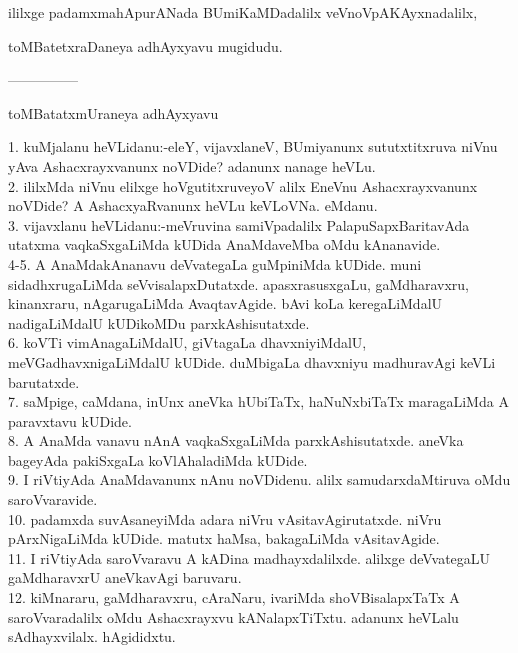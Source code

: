 \documentclass{article}
\begin{document}
\begin{center}
ililxge padamxmahApurANada BUmiKaMDadalilx veVnoVpAKAyxnadalilx,
\end{center}

\begin{center}
toMBatetxraDaneya adhAyxyavu mugidudu.
\end{center}

\begin{center}
---------------
\end{center}

\begin{center}
toMBatatxmUraneya adhAyxyavu
\end{center}

1. kuMjalanu heVLidanu:-eleY, vijavxlaneV, BUmiyanunx sututxtitxruva niVnu yAva Ashacxrayxvanunx noVDide? adanunx nanage heVLu.\\
2. ililxMda niVnu elilxge hoVgutitxruveyoV alilx EneVnu Ashacxrayxvanunx noVDide? A AshacxyaRvanunx heVLu keVLoVNa. eMdanu.\\
3. vijavxlanu heVLidanu:-meVruvina samiVpadalilx PalapuSapxBaritavAda utatxma vaqkaSxgaLiMda kUDida AnaMdaveMba oMdu kAnanavide.\\
4-5. A AnaMdakAnanavu deVvategaLa guMpiniMda kUDide. muni sidadhxrugaLiMda seVvisalapxDutatxde. apasxrasusxgaLu, gaMdharavxru, kinanxraru, nAgarugaLiMda AvaqtavAgide. bAvi koLa keregaLiMdalU nadigaLiMdalU kUDikoMDu parxkAshisutatxde.\\
6. koVTi vimAnagaLiMdalU, giVtagaLa dhavxniyiMdalU, meVGadhavxnigaLiMdalU kUDide. duMbigaLa dhavxniyu madhuravAgi keVLi barutatxde.\\
7. saMpige, caMdana, inUnx aneVka hUbiTaTx, haNuNxbiTaTx maragaLiMda A paravxtavu kUDide.\\
8. A AnaMda vanavu nAnA vaqkaSxgaLiMda parxkAshisutatxde. aneVka bageyAda pakiSxgaLa koVlAhaladiMda kUDide.\\
9. I riVtiyAda AnaMdavanunx nAnu noVDidenu. alilx samudarxdaMtiruva oMdu saroVvaravide.\\
10. padamxda suvAsaneyiMda adara niVru vAsitavAgirutatxde. niVru pArxNigaLiMda kUDide. matutx haMsa, bakagaLiMda vAsitavAgide.\\
11. I riVtiyAda saroVvaravu A kADina madhayxdalilxde. alilxge deVvategaLU gaMdharavxrU aneVkavAgi baruvaru.\\
12. kiMnararu, gaMdharavxru, cAraNaru, ivariMda shoVBisalapxTaTx A saroVvaradalilx oMdu Ashacxrayxvu kANalapxTiTxtu. adanunx heVLalu sAdhayxvilalx. hAgididxtu.\\
\end{document}
